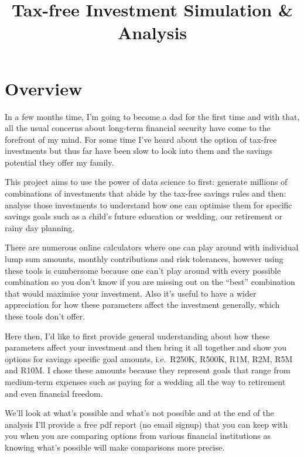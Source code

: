 \documentclass[11pt]{article}
\title{Tax-free Investment Simulation \& Analysis}
\begin{document}
    
    
    \maketitle
    
    

    
    \hypertarget{overview}{%
\section{Overview}\label{overview}}

    In a few months time, I'm going to become a dad for the first time and
with that, all the usual concerns about long-term financial security
have come to the forefront of my mind. For some time I've heard about
the option of tax-free investments but thus far have been slow to look
into them and the savings potential they offer my family.

This project aims to use the power of data science to first: generate
millions of combinations of investments that abide by the tax-free
savings rules and then: analyse those investments to understand how one
can optimise them for specific savings goals such as a child's future
education or wedding, our retirement or rainy day planning.

There are numerous online calculators where one can play around with
individual lump sum amounts, monthly contributions and risk tolerances,
however using these tools is cumbersome because one can't play around
with every possible combination so you don't know if you are missing out
on the ``best'' combination that would maximise your investment. Also
it's useful to have a wider appreciation for how these parameters affect
the investment generally, which these tools don't offer.

Here then, I'd like to first provide general understanding about how
these parameters affect your investment and then bring it all together
and show you options for savings specific goal amounts, i.e.~R250K,
R500K, R1M, R2M, R5M and R10M. I chose these amounts because they
represent goals that range from medium-term expenses such as paying for
a wedding all the way to retirement and even financial freedom.

We'll look at what's possible and what's not possible and at the end of
the analysis I'll provide a free pdf report (no email signup) that you
can keep with you when you are comparing options from various financial
institutions as knowing what's possible will make comparisons more
precise.
\end{document}
